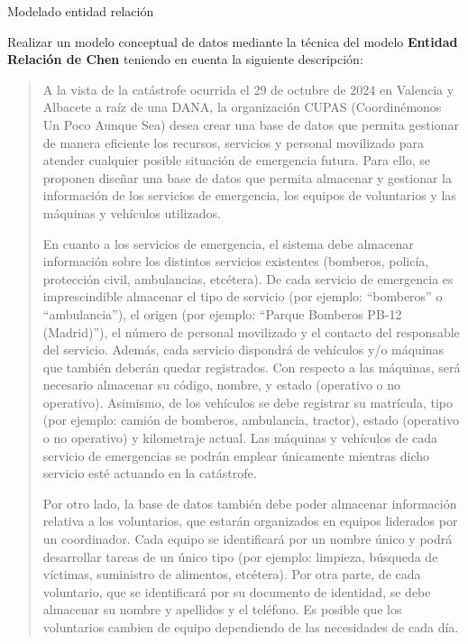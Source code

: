 \documentclass[
    12pt,
    a4paper,
    addpoints,
    answers,
    convocatoria=ord,
    titulacion=NoCD,
    curso=2024/2025,
]{db-exam}
\begin{document}
\begin{questions}

\question[2\half] Modelado entidad relación

Realizar un modelo conceptual de datos mediante la técnica del modelo \textbf{Entidad Relación de Chen} teniendo en cuenta la siguiente descripción:

\begin{quotation}
A la vista de la catástrofe ocurrida el 29 de octubre de 2024 en Valencia y Albacete a raíz de una DANA, la organización CUPAS (Coordinémonos Un Poco Aunque Sea) desea crear una base de datos que permita gestionar de manera eficiente los recursos, servicios y personal movilizado para atender cualquier posible situación de emergencia futura. Para ello, se proponen diseñar una base de datos que permita almacenar y gestionar la información de los servicios de emergencia, los equipos de voluntarios y las máquinas y vehículos utilizados.

En cuanto a los servicios de emergencia, el sistema debe almacenar información sobre los distintos servicios existentes (bomberos, policía, protección civil, ambulancias, etcétera). De cada servicio de emergencia es imprescindible almacenar el tipo de servicio (por ejemplo: ``bomberos'' o ``ambulancia''), el origen (por ejemplo: ``Parque Bomberos PB-12 (Madrid)''), el número de personal movilizado y el contacto del responsable del servicio. Además, cada servicio dispondrá de vehículos y/o máquinas que también deberán quedar registrados. Con respecto a las máquinas, será necesario almacenar su código, nombre, y estado (operativo o no operativo). Asimismo, de los vehículos se debe registrar su matrícula, tipo (por ejemplo: camión de bomberos, ambulancia, tractor), estado (operativo o no operativo) y kilometraje actual. Las máquinas y vehículos de cada servicio de emergencias se podrán emplear únicamente mientras dicho servicio esté actuando en la catástrofe.

Por otro lado, la base de datos también debe poder almacenar información relativa a los voluntarios, que estarán organizados en equipos liderados por un coordinador. Cada equipo se identificará por un nombre único y podrá desarrollar tareas de un único tipo (por ejemplo: limpieza, búsqueda de víctimas, suministro de alimentos, etcétera). Por otra parte, de cada voluntario, que se identificará por su documento de identidad, se debe almacenar su nombre y apellidos y el teléfono. Es posible que los voluntarios cambien de equipo dependiendo de las necesidades de cada día.


\end{quotation}
\end{questions}
\end{document}
